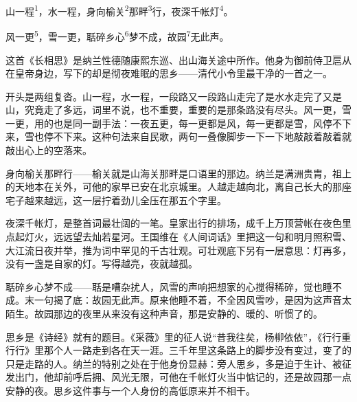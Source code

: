 
\begin{poem}
山一程\textsuperscript{1}，水一程，身向榆关\textsuperscript{2}那畔\textsuperscript{3}行，夜深千帐灯\textsuperscript{4}。

风一更\textsuperscript{5}，雪一更，聒碎乡心\textsuperscript{6}梦不成，故园\textsuperscript{7}无此声。
\end{poem}

\begin{annotations}
\end{annotations}

\begin{appreciation}
这首《长相思》是纳兰性德随康熙东巡、出山海关途中所作。他身为御前侍卫扈从在皇帝身边，写下的却是彻夜难眠的思乡——清代小令里最干净的一首之一。

开头是两组复沓。山一程，水一程，一段路又一段路山走完了是水水走完了又是山，究竟走了多远，词里不说，也不重要，重要的是那条路没有尽头。风一更，雪一更，用的也是同一副手法：一夜五更，每一更都是风，每一更都是雪，风停不下来，雪也停不下来。这种句法来自民歌，两句一叠像脚步一下一下地敲敲着敲着就敲出心上的空落来。

身向榆关那畔行——榆关就是山海关那畔是口语里的那边。纳兰是满洲贵胄，祖上的天地本在关外，可他的家早已安在北京城里。人越走越向北，离自己长大的那座宅子越来越远，这一层拧着劲儿全压在那五个字里。

夜深千帐灯，是整首词最壮阔的一笔。皇家出行的排场，成千上万顶营帐在夜色里点起灯火，远远望去灿若星河。王国维在《人间词话》里把这一句和明月照积雪、大江流日夜并举，推为词中罕见的千古壮观。可壮观底下另有一层意思：灯再多，没有一盏是自家的灯。写得越亮，夜就越孤。

聒碎乡心梦不成——聒是嘈杂扰人，风雪的声响把想家的心搅得稀碎，觉也睡不成。末一句揭了底：故园无此声。原来他睡不着，不全因风雪吵，是因为这声音太陌生。故园那边的夜里从来没有这种声音，那是安静的、暖的、听惯了的。

思乡是《诗经》就有的题目。《采薇》里的征人说“昔我往矣，杨柳依依”，《行行重行行》里那个人一路走到各在天一涯。三千年里这条路上的脚步没有变过，变了的只是走路的人。纳兰的特别之处在于他身份显赫：旁人思乡，多是迫于生计、被征发出门，他却前呼后拥、风光无限，可他在千帐灯火当中惦记的，还是故园那一点安静的夜。思乡这件事与一个人身份的高低原来并不相干。
\end{appreciation}
